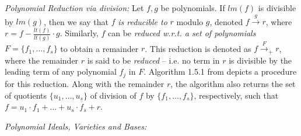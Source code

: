 \textit{{Polynomial Reduction via division:}} Let $f,
g$ be 
polynomials. If $lm(f)$ is divisible by $lm(g)$, then we say that $f$
{\it is reducible to} $r$ modulo $g$, denoted
$f\stackrel{g}{\textstyle\longrightarrow}r$, where
$r = f - {\frac{lt(f)}{lt(g)}} \cdot g$. Similarly, $f$ can be {\it
  reduced  w.r.t. a set of polynomials}  $F = \{f_1, \dots, f_s\}$ to
obtain a remainder $r$. This reduction is denoted as $f \stackrel{F}
{\textstyle \longrightarrow}_+ r$, where the remainder $r$ is said to
be {\it reduced} -- i.e. no term in $r$ is divisible by the leading
term of any polynomial $f_j$ in $F$. Algorithm 1.5.1 from \cite{gb_book} depicts a procedure for this
reduction. Along with the remainder $r$, the algorithm also returns
the set of quotients $\{u_1,\dots,u_s\}$ of division of $f$ by
$\{f_1,\dots,f_s\}$, respectively, such that $f = u_1\cdot
f_1+\dots+u_s\cdot f_s + r$. 



\textit{{Polynomial Ideals, Varieties and \Grobner
    Bases:}}


